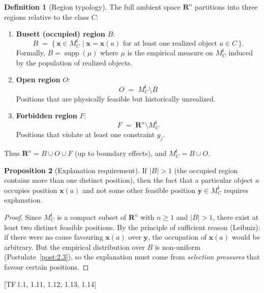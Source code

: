 \documentclass[11pt, a4paper]{article}
\theoremstyle{definition}
\newtheorem{definition}{Definition}[section]
\newtheorem{proposition}[definition]{Proposition}
\theoremstyle{plain}
\theoremstyle{remark}
\newcommand{\MC}{M^{\mathsf{I}}_C}          %
\providecommand{\Rn}{}
\renewcommand{\Rn}{\mathbf{R}^n}            %
\newcommand{\abs}[1]{\lvert #1 \rvert}
\DeclareMathOperator{\supp}{supp}
\newcommand{\TF}[1]{\textnormal{[TF\,#1]}}  %
\begin{document}
\begin{definition}[Region typology]\label{def:1.3}
The full ambient space $\Rn$ partitions into three regions relative to
the class $C$:
\begin{enumerate}[label=(\roman*),nosep]
  \item \textbf{Busett (occupied) region} $B$:
    \[
      B \;=\; \bigl\{\, \bm{x} \in \MC
        \;\big|\; \bm{x} = \bm{x}(a) \text{ for at least one
        realized object } a \in C \,\bigr\}.
    \]
    Formally, $B = \supp(\mu)$ where $\mu$ is the empirical measure
    on $\MC$ induced by the population of realized objects.

  \item \textbf{Open region} $O$:
    \[
      O \;=\; \MC \setminus \overline{B}
    \]
    Positions that are physically feasible but historically unrealized.

  \item \textbf{Forbidden region} $F$:
    \[
      F \;=\; \Rn \setminus \MC
    \]
    Positions that violate at least one constraint $g_j$.
\end{enumerate}
Thus $\Rn = B \cup O \cup F$ (up to boundary effects), and
$\MC = B \cup O$.
\end{definition}

\begin{proposition}[Explanation requirement]\label{prop:1.4}
If $\abs{B} > 1$ (the occupied region contains more than one distinct
position), then the fact that a particular object $a$ occupies position
$\bm{x}(a)$ and not some other feasible position $\bm{y} \in \MC$
requires explanation.

\begin{proof}
Since $\MC$ is a compact subset of $\Rn$ with $n \geq 1$ and $\abs{B} > 1$,
there exist at least two distinct feasible positions. By the principle of
sufficient reason (Leibniz): if there were no cause favouring $\bm{x}(a)$
over $\bm{y}$, the occupation of $\bm{x}(a)$ would be arbitrary.
But the empirical distribution over $B$ is non-uniform
(Postulate~\ref{post:2.3}), so the explanation must come from
\emph{selection pressures} that favour certain positions. \qedhere
\end{proof}
\end{proposition}

\TF{1.1, 1.11, 1.12, 1.13, 1.14}

\newpage
\end{document}
